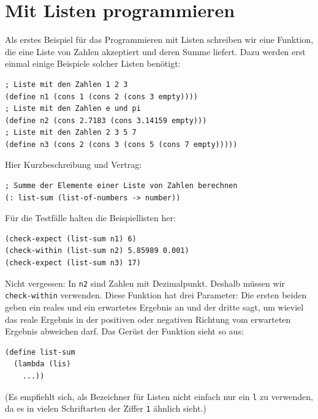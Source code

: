 \section{Mit Listen programmieren}

Als erstes Beispiel für das Programmieren mit Listen schreiben wir
eine Funktion, die eine Liste von Zahlen akzeptiert und deren Summe
liefert.  Dazu werden erst einmal einige Beispiele solcher Listen
benötigt:
%
\begin{verbatim}
; Liste mit den Zahlen 1 2 3
(define n1 (cons 1 (cons 2 (cons 3 empty))))
; Liste mit den Zahlen e und pi
(define n2 (cons 2.7183 (cons 3.14159 empty)))
; Liste mit den Zahlen 2 3 5 7
(define n3 (cons 2 (cons 3 (cons 5 (cons 7 empty)))))
\end{verbatim}

Hier Kurzbeschreibung und Vertrag:\label{sec:list-sum}
%
\begin{verbatim}
; Summe der Elemente einer Liste von Zahlen berechnen
(: list-sum (list-of-numbers -> number))
\end{verbatim}
%
Für die Testfälle halten die Beispiellisten her:
%
\begin{verbatim}
(check-expect (list-sum n1) 6)
(check-within (list-sum n2) 5.85989 0.001)
(check-expect (list-sum n3) 17)
\end{verbatim}
%
Nicht vergessen: In \texttt{n2} sind Zahlen mit Dezimalpunkt.
Deshalb müssen wir \texttt{check-within} verwenden.  Diese Funktion
hat drei Parameter: Die ersten beiden geben ein reales und ein
erwartetes Ergebnis an
und der dritte sagt, um wieviel das reale Ergebnis in der positiven
oder negativen Richtung vom erwarteten Ergebnis abweichen darf. Das Gerüst der
Funktion sieht so aus:
%
\begin{verbatim}
(define list-sum
  (lambda (lis)
    ...))
\end{verbatim}
%
(Es empfiehlt sich, als Bezeichner für Listen nicht einfach nur ein
\texttt{l} zu verwenden, da es in vielen Schriftarten der Ziffer
\texttt{1} ähnlich sieht.)

